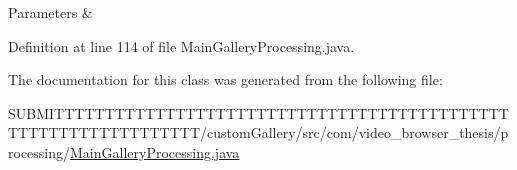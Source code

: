 \begin{DoxyParams}{Parameters}
{\em } & \\
\hline
\end{DoxyParams}


Definition at line 114 of file Main\-Gallery\-Processing.\-java.



The documentation for this class was generated from the following file\-:\begin{DoxyCompactItemize}
\item 
S\-U\-B\-M\-I\-T\-T\-T\-T\-T\-T\-T\-T\-T\-T\-T\-T\-T\-T\-T\-T\-T\-T\-T\-T\-T\-T\-T\-T\-T\-T\-T\-T\-T\-T\-T\-T\-T\-T\-T\-T\-T\-T\-T\-T\-T\-T\-T\-T\-T\-T\-T\-T\-T\-T\-T\-T\-T\-T\-T\-T\-T\-T\-T\-T\-T\-T\-T\-T/custom\-Gallery/src/com/video\-\_\-browser\-\_\-thesis/processing/\hyperlink{_main_gallery_processing_8java}{Main\-Gallery\-Processing.\-java}\end{DoxyCompactItemize}
